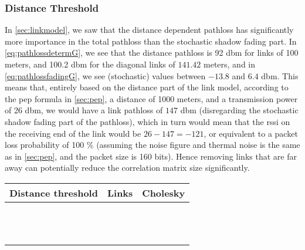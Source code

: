 \subsubsection{Distance Threshold}\label{sec:distancethreshold}
In \autoref{sec:linkmodel}, we saw that the distance dependent \gls{pathloss} has significantly more importance in the total \gls{pathloss} than the stochastic shadow fading part. In \autoref{eq:pathlossdetermG}, we see that the distance \gls{pathloss} is 92 \acrshort{dbm} for links of 100 meters, and 100.2 \acrshort{dbm} for the diagonal links of $141.42$ meters, and in \autoref{eq:pathlossfadingG}, we see (stochastic) values between $-13.8$ and $6.4$ \acrshort{dbm}. This means that, entirely based on the distance part of the link model, according to the \gls{pep} formula in \autoref{sec:pep}, a distance of 1000 meters, and a transmission power of 26 \acrshort{dbm}, we would have a link \gls{pathloss} of $147$ \acrshort{dbm} (disregarding the stochastic shadow fading part of the \gls{pathloss}), which in turn would mean that the \gls{rssi} on the receiving end of the link would be $26 - 147 = -121$, or equivalent to a packet loss probability of 100 \% (assuming the noise figure and thermal noise is the same as in \autoref{sec:pep}, and the packet size is 160 bits). Hence removing links that are far away can potentially reduce the correlation matrix size significantly.

\begin{table}[H]
    \begin{tabular}{|c|c|c|}
        \hline
        Distance threshold & Links & Cholesky \\\hline
                           &       &          \\\hline
                           &       &          \\\hline
                           &       &          \\\hline
                           &       &          \\\hline
                           &       &          \\\hline
                           &       &          \\\hline
                           &       &          \\\hline
                           &       &          \\\hline
                           &       &          \\\hline
                           &       &          \\\hline
                           &       &          \\\hline
                           &       &          \\\hline
    \end{tabular}
\end{table}

